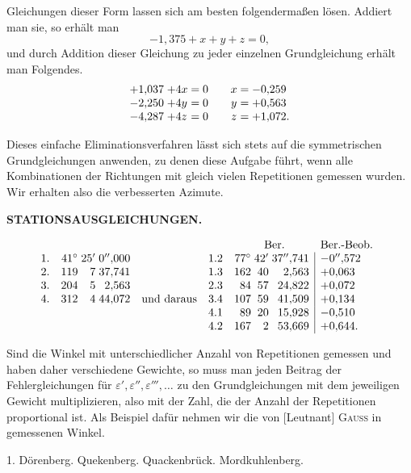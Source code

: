 Gleichungen dieser Form lassen sich am besten folgendermaßen lösen. Addiert man sie, so erhält man
\[
 -1{,}375+x+y+z=0,
\]
und durch Addition dieser Gleichung zu jeder einzelnen Grundgleichung erhält man Folgendes.
\[
\begin{array}{@{}r@{\;}l@{\;=\;}r@{\qquad}c@{\;=\;}l@{}}
 +1{,}037&+4x&0&x&-0{,}259\\
 -2{,}250&+4y&0&y&+0{,}563\\
 -4{,}287&+4z&0&z&+1{,}072.
\end{array}
\]

Dieses einfache Eliminationsverfahren lässt sich stets auf die symmetrischen Grundgleichungen anwenden, zu denen diese Aufgabe führt, wenn alle Kombinationen der Richtungen mit gleich vielen Repetitionen gemessen wurden. Wir erhalten also die verbesserten Azimute.

\par\clearpage
\noindent\null\hfill{\small\textbf{STATIONSAUSGLEICHUNGEN.}}\hfill{}\par\medskip

\[
\begin{array}{@{}l@{\quad}r@{\;}r@{\;}r@{\quad}l@{\quad}r@{\quad}r@{\;}r@{\;}r|l@{}}
 \multicolumn{6}{c}{}&\multicolumn{3}{c}{\text{Ber.}}&\multicolumn{1}{c}{\text{Ber.-Beob.}}\\
 1.&41^\circ&25'&0''{,}000&&1.2&77^\circ&42'&37''{,}741&-0''{,}572\\
 2.&119&7&37{,}741&&1.3&162&40&2{,}563&+0{,}063\\
 3.&204&5&2{,}563&&2.3&84&57&24{,}822&+0{,}072\\
 4.&312&4&44{,}072&\text{und daraus}&3.4&107&59&41{,}509&+0{,}134\\
 &&&&&4.1&89&20&15{,}928&-0{,}510\\
 &&&&&4.2&167&2&53{,}669&+0{,}644.
\end{array}
\]

Sind die Winkel mit unterschiedlicher Anzahl von Repetitionen gemessen und haben daher verschiedene Gewichte, so muss man jeden Beitrag der Fehlergleichungen für \(\varepsilon',\varepsilon'',\varepsilon''',\ldots\) zu den Grundgleichungen mit dem jeweiligen Gewicht multiplizieren, also mit der Zahl, die der Anzahl der Repetitionen proportional ist. Als Beispiel dafür nehmen wir die von [Leutnant] \textsc{Gauss} in  gemessenen Winkel.

\begin{center}
 1. Dörenberg. Quekenberg. Quackenbrück. Mordkuhlenberg.
\end{center}

